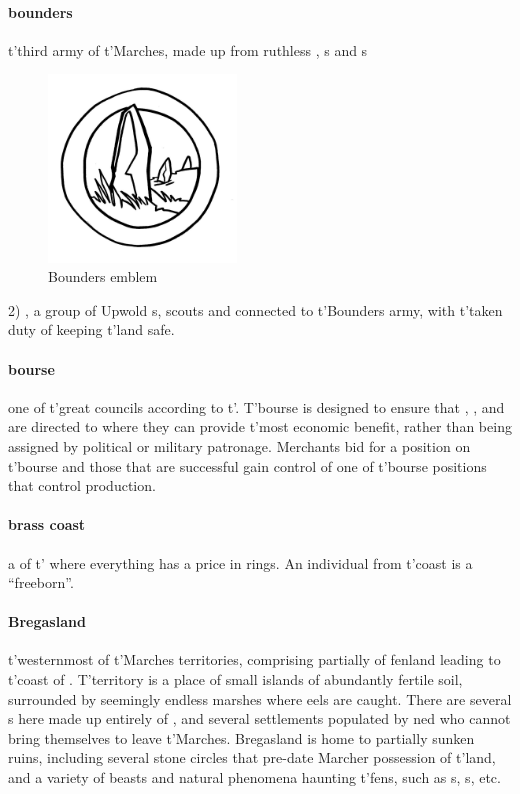 \paragraph{bounders}  t'\allowbreak third army of t'Marches, made up from ruthless  , s and s \begin{figure}\centering\includegraphics[width=5cm]{encyclopedia/TheBounders}\caption{Bounders emblem}\end{figure} 2) , a group of Upwold s, scouts and  connected to t'\allowbreak Bounders army, with t'\allowbreak taken duty of keeping t'\allowbreak land safe.
\paragraph{bourse} one of t'\allowbreak great councils according to t'\allowbreak {}. T'bourse is designed to ensure that , ,  and  are directed to where they can provide t'\allowbreak most economic benefit, rather than being assigned by political or military patronage. Merchants bid for a position on t'\allowbreak bourse and those that are successful gain control of one of t'\allowbreak bourse positions that control production.
\paragraph{brass coast} a  of t' where everything has a price in rings. An individual from t'\allowbreak coast is a “freeborn”.
\paragraph{Bregasland} t'\allowbreak westernmost of t'\allowbreak Marches territories, comprising partially of fenland leading to t'\allowbreak coast of . T'territory is a place of small islands of abundantly fertile soil, surrounded by seemingly endless marshes where eels are caught. There are several s here made up entirely of , and several settlements populated by ned who cannot bring themselves to leave t'\allowbreak Marches. Bregasland is home to partially sunken ruins, including several stone circles that pre-date Marcher possession of t'\allowbreak land, and a variety of beasts and natural phenomena haunting t'\allowbreak fens, such as s, s, etc.
